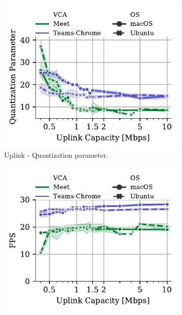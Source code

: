 \begin{figure}[t]
        \begin{subfigure}[t]{0.33\textwidth}
    		\centering
        \includegraphics[width=\textwidth,keepaspectratio]{figures/static_mac/uplink_s_qpsum_comparison.pdf}
        \caption{Uplink - Quantization parameter.}
 		\label{subfig:uplink_video_qp_mac}
    \end{subfigure}%
    \hfill
	\begin{subfigure}[t]{0.33\textwidth}
        \centering
        \includegraphics[width=\textwidth]{figures/static_mac/uplink_sent_framesPerSecond_comparison.pdf}

\end{subfigure}
\end{figure}
